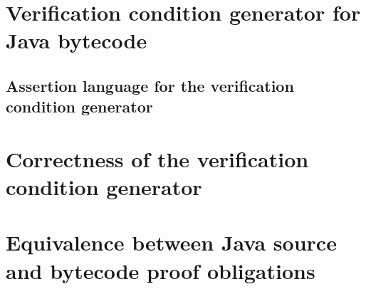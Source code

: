\documentclass[book,10pt]{book}
\begin{document}
\chapter{Verification condition generator for Java bytecode } \label{wpGeneral}
  

\section{Assertion language for the verification condition generator}\label{assertLang}
  \label{assertLang}
  

  

   
 
   
  
   
  
  
  
   
  

\chapter{Correctness of the verification condition generator}\label{proofGeneral}
  
   
  
  
  
  



\chapter{Equivalence between Java source and bytecode proof obligations}\label{pogEquiv}
  
 
 
   
	 
  
   
  
  
\end{document}
